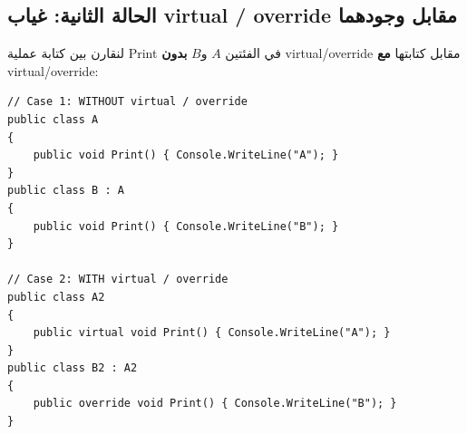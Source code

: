 \documentclass[14pt]{extarticle}
\begin{document}
\filbreak
\subsection*{الحالة الثانية: غياب \textenglish{virtual} / \textenglish{override} مقابل وجودهما}
لنقارن بين كتابة عملية \textenglish{Print} في الفئتين $A$ و$B$ \textbf{بدون} \textenglish{virtual}/\textenglish{override} مقابل كتابتها \textbf{مع} \textenglish{virtual}/\textenglish{override}:

\begin{boxCode}
\begin{english}
\begin{verbatim}
// Case 1: WITHOUT virtual / override
public class A
{
    public void Print() { Console.WriteLine("A"); }
}
public class B : A
{
    public void Print() { Console.WriteLine("B"); }
}

// Case 2: WITH virtual / override
public class A2
{
    public virtual void Print() { Console.WriteLine("A"); }
}
public class B2 : A2
{
    public override void Print() { Console.WriteLine("B"); }
}
\end{verbatim}
\end{english}
\end{boxCode}
\end{document}
